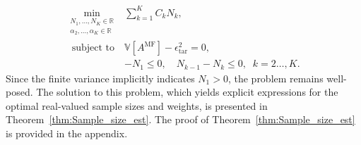 %
\begin{equation}\label{eq:Optimization_pb_sample_size}
    \begin{array}{ll}
    \min \limits_{\begin{array}{c}\scriptstyle N_1,\ldots, N_K\in \mathbb{R} \\[-4pt]
\scriptstyle \alpha_2,\ldots,\alpha_K\in \mathbb{R}
\end{array}} &\displaystyle\sum\limits_{k=1}^K C_kN_k,\\
       \;\,\text{subject to} &\mathbb{V}\left[A^{\text{MF}}\right]- \epsilon_{\text{tar}}^2 = 0,\\[2pt]
       &\displaystyle -N_1\le 0,\quad \displaystyle N_{k-1}-N_k\le 0, \;\; k=2\ldots,K.
    \end{array}
\end{equation}
%
Since the finite variance implicitly indicates $N_1 > 0$, the problem remains well-posed. The solution to this problem, which yields explicit expressions for the optimal real-valued sample sizes and weights, is presented in Theorem~\ref{thm:Sample_size_est}. The proof of Theorem~\ref{thm:Sample_size_est} is provided in the appendix.




